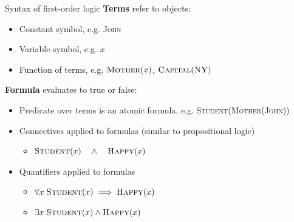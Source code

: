\documentclass[usenames,dvipsnames,notes,11pt,aspectratio=169]{beamer}
\begin{document}
\begin{frame}
    {Syntax of first-order logic}
    \textbf{Terms} refer to objects:\\
    \begin{itemize}
        \item Constant symbol, e.g. \textsc{John}
        \item Variable symbol, e.g. $x$
        \item Function of terms, e.g. $\textsc{Mother}(x)$, $\textsc{Capital}(\textsc{NY})$
    \end{itemize}

    \textbf{Formula} evaluates to true or false:\\
    \begin{itemize}
        \item Predicate over terms is an atomic formula, e.g. \textsc{Student}(\textsc{Mother}(\textsc{John}))
        \item Connectives applied to formulas (similar to propositional logic)
            \begin{itemize}
                \item[] $\textsc{Student}(x) \quad\land\quad \textsc{Happy}(x)$
            \end{itemize}
        \item Quantifiers applied to formulas 
            \begin{itemize}
                \item[] $\forall x \;\textsc{Student}(x) \implies \textsc{Happy}(x)$
                \item[] $\exists x \;\textsc{Student}(x) \land \textsc{Happy}(x)$
            \end{itemize}
    \end{itemize}
\end{frame}
\end{document}
